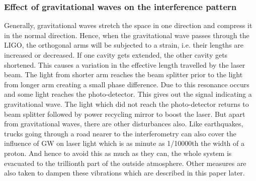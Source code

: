 \subsubsection{Effect of gravitational waves on the interference pattern}

Generally, gravitational waves stretch the space in one direction and compress it in the normal direction. Hence, when the gravitational wave passes through the LIGO, the orthogonal arms will be subjected to a strain, i.e. their lengths are increased or decreased. If one cavity gets extended, the other cavity gets shortened. This causes a variation in the effective length travelled by the laser beam. The light from shorter arm reaches the beam splitter prior to the light from longer arm creating a small phase difference. Due to this resonance occurs and some light reaches the photo-detector. This gives out the signal indicating a gravitational wave. The light which did not reach the photo-detector returns to beam splitter followed by power recycling mirror to boost the laser.
But apart from gravitational waves, there are other disturbances also. Like earthquakes, trucks going through a road nearer to the interferometry can also cover the influence of GW on laser light which is as minute as 1/10000th the width of a proton. And hence to avoid this as much as they can, the whole system is evacuated to the trillionth part of the outside atmosphere. Other measures are also taken to dampen these vibrations which are described in this paper later.
 
\pagebreak


















































































\pagebreak
